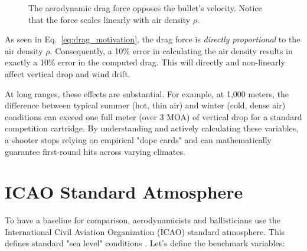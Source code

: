 \documentclass[11pt,twoside,openright]{report}
\begin{document}
\begin{figure}[H]
\centering
{}
\caption{The aerodynamic drag force opposes the bullet's velocity. Notice that the force scales linearly with air density $\rho$.}
\label{fig:drag_force_diagram}
\end{figure}

As seen in Eq.~\eqref{eq:drag_motivation}, the drag force is \emph{directly proportional} to the air density $\rho$. Consequently, a 10\% error in calculating the air density results in exactly a 10\% error in the computed drag. This will directly and non-linearly affect vertical drop and wind drift.

At long ranges, these effects are substantial. For example, at 1,000 meters, the difference between typical summer (hot, thin air) and winter (cold, dense air) conditions can exceed one full meter (over 3 MOA) of vertical drop for a standard competition cartridge. By understanding and actively calculating these variables, a shooter stops relying on empirical "dope cards" and can mathematically guarantee first-round hits across varying climates.

\section{ICAO Standard Atmosphere}
\label{sec:icao}

To have a baseline for comparison, aerodynamicists and ballisticians use the International Civil Aviation Organization (ICAO) standard atmosphere. This defines standard "sea level" conditions \citep{icao1993manual,coesa1976standard}. Let's define the benchmark variables:
\end{document}
